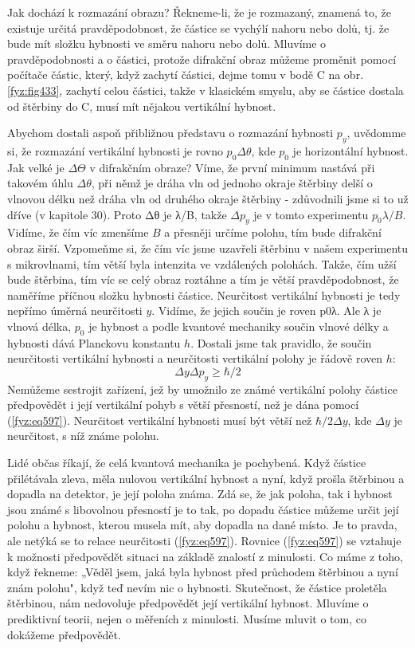     Jak dochází k rozmazání obrazu? Řekneme-li, že je rozmazaný, znamená to, že existuje určitá
    pravděpodobnost, že částice se vychýlí nahoru nebo dolů, tj. že bude mít složku hybnosti ve
    směru nahoru nebo dolů. Mluvíme o pravděpodobnosti a o částici, protože difrakční obraz můžeme
    proměnit pomocí počítače částic, který, když zachytí částici, dejme tomu v bodě C na obr.
    \ref{fyz:fig433}, zachytí celou částici, takže v klasickém smyslu, aby se částice dostala od
    štěrbiny do C, musí mít nějakou vertikální hybnost.

    Abychom dostali aspoň přibližnou představu o rozmazání hybnosti \(p_y\), uvědomme si, že
    rozmazání vertikální hybnosti je rovno \(p_0Δθ\), kde \(p_0\) je horizontální hybnost. Jak velké
    je \(\Delta \Theta\) v difrakčním obraze? Víme, že první minimum nastává při takovém úhlu
    \(Δθ\), při němž je dráha vln od jednoho okraje štěrbiny delší o vlnovou délku než dráha vln od
    druhého okraje štěrbiny - zdůvodnili jsme si to už dříve (v kapitole 30). Proto Δθ je λ/B, takže
    \(Δp_y\) je v tomto experimentu \(p_0λ/B\). Vidíme, že čím víc zmenšíme \(B\) a přesněji určíme
    polohu, tím bude difrakční obraz širší. Vzpomeňme si, že čím víc jsme uzavřeli štěrbinu v našem
    experimentu s mikrovlnami, tím větší byla intenzita ve vzdálených polohách. Takže, čím užší bude
    štěrbina, tím víc se celý obraz roztáhne a tím je větší pravděpodobnost, že naměříme příčnou
    složku hybnosti částice. Neurčitost vertikální hybnosti je tedy nepřímo úměrná neurčitosti
    \(y\). Vidíme, že jejich součin je roven p0λ. Ale λ je vlnová délka, \(p_0\) je hybnost a podle
    kvantové mechaniky součin vlnové délky a hybnosti dává Planckovu konstantu \(h\). Dostali jsme
    tak pravidlo, že součin neurčitosti vertikální hybnosti a neurčitosti vertikální polohy je
    řádově roven \(h\):
    \begin{equation}\label{fyz:eq597}
      \boxed{ΔyΔp_y ≥ \hbar/2}
    \end{equation}
    Nemůžeme sestrojit zařízení, jež by umožnilo ze známé vertikální polohy částice předpovědět i
    její vertikální pohyb s větší přesností, než je dána pomocí (\ref{fyz:eq597}). Neurčitost
    vertikální hybnosti musí být větší než \(\hbar/2Δy\), kde \(Δy\) je neurčitost, s níž známe
    polohu.

    Lidé občas říkají, že celá kvantová mechanika je pochybená. Když částice přilétávala zleva, měla
    nulovou vertikální hybnost a nyní, když prošla štěrbinou a dopadla na detektor, je její poloha
    známa. Zdá se, že jak poloha, tak i hybnost jsou známé s libovolnou přesností je to tak, po
    dopadu částice můžeme určit její polohu a hybnost, kterou musela mít, aby dopadla na dané místo.
    Je to pravda, ale netýká se to relace neurčitosti (\ref{fyz:eq597}). Rovnice (\ref{fyz:eq597})
    se vztahuje k možnosti předpovědět situaci na základě znalostí z minulosti. Co máme z toho, když
    řekneme: „Věděl jsem, jaká byla hybnost před průchodem štěrbinou a nyní znám polohu", když teď
    nevím nic o hybnosti. Skutečnost, že částice proletěla štěrbinou, nám nedovoluje předpovědět
    její vertikální hybnost. Mluvíme o prediktivní teorii, nejen o měřeních z minulosti. Musíme
    mluvit o tom, co dokážeme předpovědět.

